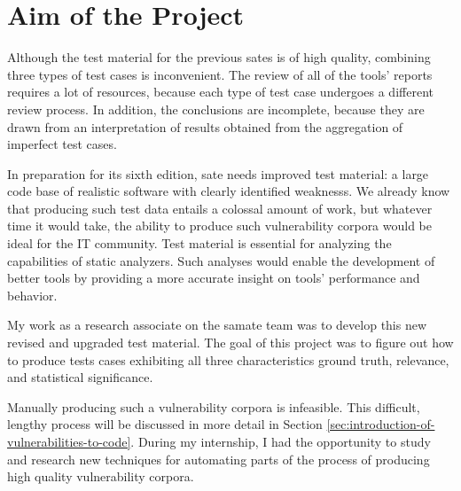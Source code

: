 \section{Aim of the Project}

Although the test material for the previous \gls{sate}s is of high quality, combining three types of test cases is inconvenient. The review of all of the tools' reports requires a lot of resources, because each type of test case undergoes a different review process. In addition, the conclusions are incomplete, because they are drawn from an interpretation of results obtained from the aggregation of imperfect test cases.

In preparation for its sixth edition, \gls{sate} needs improved test material: a large code base of realistic software with clearly identified \glspl{weakness}. We already know that producing such test data entails a colossal amount of work, but whatever time it would take, the ability to produce such \gls{vulnerability} corpora would be ideal for the IT community. Test material is essential for analyzing the capabilities of static analyzers. Such analyses would enable the development of better tools by providing a more accurate insight on tools' performance and behavior.

My work as a research associate on the \gls{samate} team was to develop this new revised and upgraded test material. The goal of this project was to figure out how to produce tests cases exhibiting all three characteristics ground truth, relevance, and statistical significance.

Manually producing such a \gls{vulnerability} corpora is infeasible. This difficult, lengthy process will be discussed in more detail in Section \ref{sec:introduction-of-vulnerabilities-to-code}. During my internship, I had the opportunity to study and research new techniques for automating parts of the process of producing high quality \gls{vulnerability} corpora.